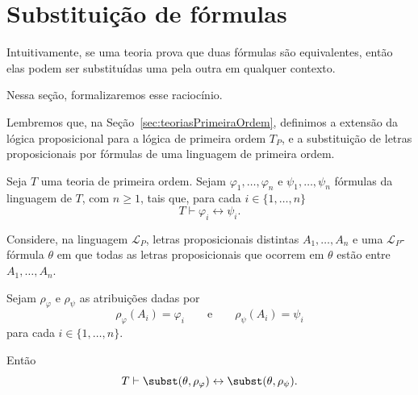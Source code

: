 \section{Substituição de fórmulas}\label{sec:substituicaoDeFormulas}

Intuitivamente, se uma teoria prova que duas fórmulas são equivalentes, então elas podem ser substituídas uma pela outra em qualquer contexto.

Nessa seção, formalizaremos esse raciocínio.

Lembremos que, na Seção~\ref{sec:teoriasPrimeiraOrdem}, definimos a extensão da lógica proposicional para a lógica de primeira ordem $T_P$, e a substituição de letras proposicionais por fórmulas de uma linguagem de primeira ordem.

\begin{metatheorem}\label{mthm:substituicaoFormulasEquivalentes}
    Seja $T$ uma teoria de primeira ordem.
    Sejam $\varphi_1,\dots,\varphi_n$ e $\psi_1,\dots,\psi_n$ fórmulas da linguagem de $T$, com $n\geq 1$, tais que, para cada $i\in\{1,\dots,n\}$
    \[
        T\vdash \varphi_i\leftrightarrow\psi_i.
    \]

    Considere, na linguagem $\mathcal L_P$, letras proposicionais distintas $A_1,\dots,A_n$ e uma $\mathcal L_P$-fórmula $\theta$ em que todas as letras proposicionais que ocorrem em $\theta$ estão entre $A_1,\dots,A_n$.

    Sejam $\rho_\varphi$ e $\rho_\psi$ as atribuições dadas por
    \[
        \rho_\varphi(A_i)=\varphi_i
        \qquad\text{e}\qquad
        \rho_\psi(A_i)=\psi_i
    \]
    para cada $i\in\{1,\dots,n\}$.

    Então
    \[
        T\vdash \subst(\theta,\rho_\varphi)\leftrightarrow \subst(\theta,\rho_\psi).
    \]
\end{metatheorem}

